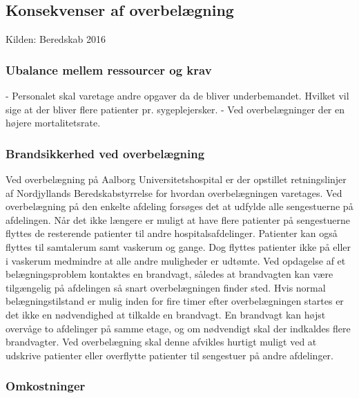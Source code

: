 \subsection{Konsekvenser af overbelægning}
Kilden: Beredskab 2016

\subsubsection{Ubalance mellem ressourcer og krav}
- Personalet skal varetage andre opgaver da de bliver underbemandet. Hvilket vil sige at der bliver flere patienter pr. sygeplejersker. 
- Ved overbelægninger der en højere mortalitetsrate. 




\subsubsection{Brandsikkerhed ved overbelægning}
Ved overbelægning på Aalborg Universitetshospital er der opstillet retningslinjer af Nordjyllands Beredskabstyrrelse for hvordan overbelægningen varetages. \citep{Beredskab2016} Ved overbelægning på den enkelte afdeling forsøges det at udfylde alle sengestuerne på afdelingen. Når det ikke længere er muligt at have flere patienter på sengestuerne flyttes de resterende patienter til andre hospitalsafdelinger. Patienter kan også flyttes til samtalerum samt vaskerum og gange. \citep{Beredskab2016} Dog flyttes patienter ikke på eller i vaskerum medmindre at alle andre muligheder er udtømte. 
Ved opdagelse af et belægningsproblem kontaktes en brandvagt, således at brandvagten kan være tilgængelig på afdelingen så snart overbelægningen finder sted. Hvis normal belægningstilstand er mulig inden for fire timer efter overbelægningen startes er det ikke en nødvendighed at tilkalde en brandvagt. En brandvagt kan højst overvåge to afdelinger på samme etage, og om nødvendigt skal der indkaldes flere brandvagter. \citep{Beredskab2016} Ved overbelægning skal denne afvikles hurtigt muligt ved at udskrive patienter eller overflytte patienter til sengestuer på andre afdelinger. 

\subsubsection{Omkostninger}












